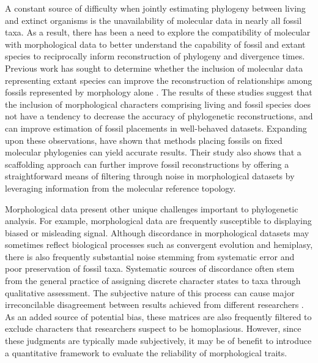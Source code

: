 \documentclass[12pt]{article}
\begin{document}
A constant source of difficulty when jointly estimating phylogeny between living
and extinct organisms is the unavailability of molecular data in nearly
all fossil taxa. As a result, there has been a need to explore the
compatibility of molecular with morphological data to better understand
the capability of fossil and extant species to reciprocally inform
reconstruction of phylogeny and divergence times. Previous work has
sought to determine whether the inclusion of molecular data representing
extant species can improve the reconstruction of relationships among
fossils represented by morphology alone \citep{wiens2009paleontology,wiens2010combining}. The results
of these studies suggest that the inclusion of morphological characters
comprising living and fossil species does not have a tendency to
decrease the accuracy of phylogenetic reconstructions, and can improve
estimation of fossil placements in well-behaved datasets. Expanding upon
these observations, \cite{berger2010fossilplacement} have shown that methods
placing fossils on fixed molecular phylogenies can yield accurate
results. Their study also shows that a scaffolding approach can further improve fossil reconstructions 
by offering a straightforward means of filtering through noise in morphological datasets
by leveraging information from the molecular reference topology.

Morphological data present other unique challenges important to phylogenetic analysis. For example, morphological data are frequently susceptible to
displaying biased or misleading signal. Although discordance in morphological datasets may sometimes reflect biological processes such as convergent evolution and hemiplasy, there is also frequently substantial noise stemming from systematic error and poor preservation of fossil taxa. Systematic sources of discordance often stem from
the general practice of assigning discrete character states to taxa
through qualitative assessment. The subjective nature of this process
can cause major irreconcilable disagreement between results achieved
from different researchers \citep{hauser1991effect,pleijel1995character,wilkinson1995comparison,
hawkins1997primary,scotland2000homology,scotland2003phylogeny,brazeau2011problematic,simoes2017giant}. As an added source of
potential bias, these matrices are also frequently filtered to exclude
 characters that researchers suspect to be homoplasious. However,
 since these judgments are typically made subjectively, it may be of
 benefit to introduce a quantitative framework to evaluate the reliability
 of morphological traits.
 
\end{document}
